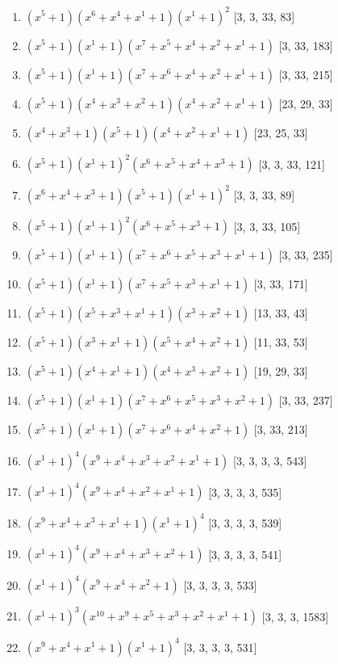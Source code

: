 \documentclass[10pt,twocolumn]{article}
\begin{document}
\begin{enumerate}
\item $(x^{5} + 1)(x^{6} + x^{4} + x^{1} + 1)(x^{1} + 1)^{2}$  [3, 3, 33, 83]
\item $(x^{5} + 1)(x^{1} + 1)(x^{7} + x^{5} + x^{4} + x^{2} + x^{1} + 1)$  [3, 33, 183]
\item $(x^{5} + 1)(x^{1} + 1)(x^{7} + x^{6} + x^{4} + x^{2} + x^{1} + 1)$  [3, 33, 215]
\item $(x^{5} + 1)(x^{4} + x^{3} + x^{2} + 1)(x^{4} + x^{2} + x^{1} + 1)$  [23, 29, 33]
\item $(x^{4} + x^{3} + 1)(x^{5} + 1)(x^{4} + x^{2} + x^{1} + 1)$  [23, 25, 33]
\item $(x^{5} + 1)(x^{1} + 1)^{2}(x^{6} + x^{5} + x^{4} + x^{3} + 1)$  [3, 3, 33, 121]
\item $(x^{6} + x^{4} + x^{3} + 1)(x^{5} + 1)(x^{1} + 1)^{2}$  [3, 3, 33, 89]
\item $(x^{5} + 1)(x^{1} + 1)^{2}(x^{6} + x^{5} + x^{3} + 1)$  [3, 3, 33, 105]
\item $(x^{5} + 1)(x^{1} + 1)(x^{7} + x^{6} + x^{5} + x^{3} + x^{1} + 1)$  [3, 33, 235]
\item $(x^{5} + 1)(x^{1} + 1)(x^{7} + x^{5} + x^{3} + x^{1} + 1)$  [3, 33, 171]
\item $(x^{5} + 1)(x^{5} + x^{3} + x^{1} + 1)(x^{3} + x^{2} + 1)$  [13, 33, 43]
\item $(x^{5} + 1)(x^{3} + x^{1} + 1)(x^{5} + x^{4} + x^{2} + 1)$  [11, 33, 53]
\item $(x^{5} + 1)(x^{4} + x^{1} + 1)(x^{4} + x^{3} + x^{2} + 1)$  [19, 29, 33]
\item $(x^{5} + 1)(x^{1} + 1)(x^{7} + x^{6} + x^{5} + x^{3} + x^{2} + 1)$  [3, 33, 237]
\item $(x^{5} + 1)(x^{1} + 1)(x^{7} + x^{6} + x^{4} + x^{2} + 1)$  [3, 33, 213]
\item $(x^{1} + 1)^{4}(x^{9} + x^{4} + x^{3} + x^{2} + x^{1} + 1)$  [3, 3, 3, 3, 543]
\item $(x^{1} + 1)^{4}(x^{9} + x^{4} + x^{2} + x^{1} + 1)$  [3, 3, 3, 3, 535]
\item $(x^{9} + x^{4} + x^{3} + x^{1} + 1)(x^{1} + 1)^{4}$  [3, 3, 3, 3, 539]
\item $(x^{1} + 1)^{4}(x^{9} + x^{4} + x^{3} + x^{2} + 1)$  [3, 3, 3, 3, 541]
\item $(x^{1} + 1)^{4}(x^{9} + x^{4} + x^{2} + 1)$  [3, 3, 3, 3, 533]
\item $(x^{1} + 1)^{3}(x^{10} + x^{9} + x^{5} + x^{3} + x^{2} + x^{1} + 1)$  [3, 3, 3, 1583]
\item $(x^{9} + x^{4} + x^{1} + 1)(x^{1} + 1)^{4}$  [3, 3, 3, 3, 531]

\end{enumerate}
\end{document}
